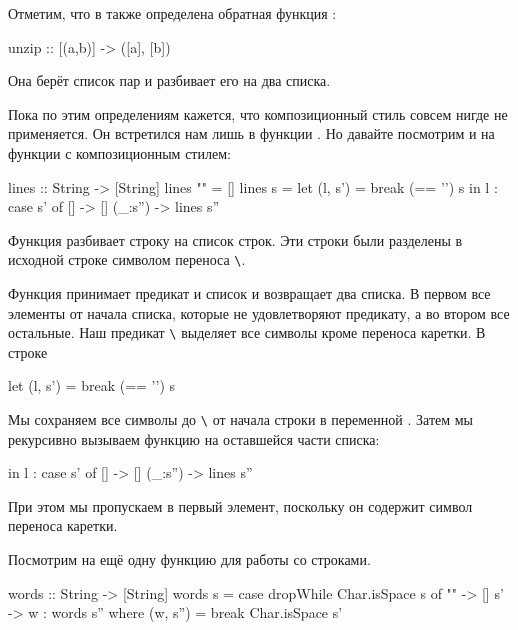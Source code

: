 Отметим, что в  также определена обратная функция
:


\begin{code}
unzip   :: [(a,b)] -> ([a], [b]) 
\end{code}

Она берёт список пар и разбивает его на два списка.

Пока по этим определениям кажется, что композиционный стиль совсем нигде
не применяется. Он встретился нам лишь в функции . Но давайте
посмотрим и на функции с композиционным стилем:


\begin{code}
lines            :: String -> [String]
lines ""         =  []
lines s          =  let (l, s') = break (== '\n') s
                    in  l : case s' of
                              []      -> []
                              (_:s'') -> lines s''
\end{code}

Функция  разбивает строку на список строк. Эти строки были
разделены в исходной строке символом переноса \verb!\!.

Функция  принимает предикат и список и возвращает два списка.
В первом все элементы от начала списка, которые не удовлетворяют
предикату, а во втором все остальные. Наш предикат
\verb!\! выделяет все символы кроме переноса каретки.
В строке


\begin{code}
let (l, s') = break (== '\n') s
\end{code}

Мы сохраняем все символы до \verb!\! от начала строки в
переменной . Затем мы рекурсивно вызываем функцию  на
оставшейся части списка:


\begin{code}
                    in  l : case s' of
                              []      -> []
                              (_:s'') -> lines s''
\end{code}

При этом мы пропускаем в  первый элемент, поскольку он содержит
символ переноса каретки.

Посмотрим на ещё одну функцию для работы со строками.


\begin{code}
words            :: String -> [String]
words s          =  case dropWhile Char.isSpace s of
                      "" -> []
                      s' -> w : words s''
                            where (w, s'') = break Char.isSpace s'
\end{code}


